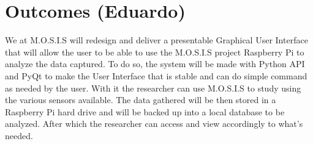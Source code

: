 \section{Outcomes (Eduardo)}
We at M.O.S.I.S will redesign and deliver a presentable Graphical User Interface that will allow the user to be able to use the M.O.S.I.S project Raspberry Pi to analyze the data captured. To do so, the system will be made with Python API and PyQt to make the User Interface that is stable and can do simple command as needed by the user. 
With it the researcher can use M.O.S.I.S to study using the various sensors available. The data gathered will be then stored in a Raspberry Pi hard drive and will be backed up into a local database to be analyzed. After which the researcher can access and view accordingly to what's needed.